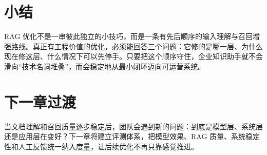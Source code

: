 \section{小结}
RAG 优化不是一串彼此独立的小技巧，而是一条有先后顺序的输入理解与召回增强路线。真正有工程价值的优化，必须能回答三个问题：它修的是哪一层、为什么现在修这层、什么情况下可以先停手。只要把这个顺序守住，企业知识助手就不会滑向“技术名词堆叠”，而会稳定地从最小闭环迈向可运营系统。

\section{下一章过渡}
当文档理解和召回质量逐步稳定后，团队会遇到新的问题：到底是模型层、系统层还是应用层在变好？下一章将建立评测体系，把模型效果、RAG 质量、系统稳定性和人工反馈统一纳入度量，让后续优化不再只靠感觉推进。
